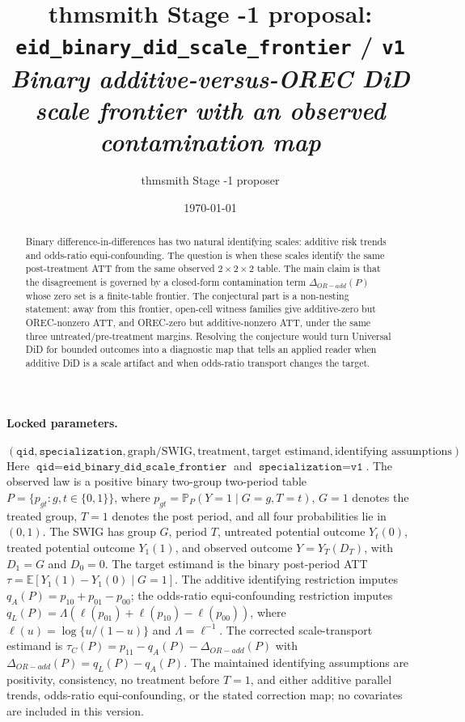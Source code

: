 \documentclass[11pt]{article}
\title{thmsmith Stage -1 proposal: \texttt{eid\_binary\_did\_scale\_frontier} / \texttt{v1}%
  \\ \large\textit{Binary additive-versus-OREC DiD scale frontier with an observed contamination map}}
\author{thmsmith Stage -1 proposer}
\date{\today}
\newcommand{\E}{\mathbb{E}}
\renewcommand{\Pr}{\mathbb{P}}
\theoremstyle{definition}
\theoremstyle{plain}
\theoremstyle{remark}
\begin{document}
\maketitle


\paragraph{Locked parameters.}
\[
(\texttt{qid},\texttt{specialization},\text{graph/SWIG},\text{treatment},\text{target estimand},\text{identifying assumptions}).
\]
Here \(\texttt{qid}=\texttt{eid\_binary\_did\_scale\_frontier}\) and \(\texttt{specialization}=\texttt{v1}\).  The observed law is a positive binary two-group two-period table \(P=\{p_{gt}:g,t\in\{0,1\}\}\), where \(p_{gt}=\Pr_P(Y=1\mid G=g,T=t)\), \(G=1\) denotes the treated group, \(T=1\) denotes the post period, and all four probabilities lie in \((0,1)\).  The SWIG has group \(G\), period \(T\), untreated potential outcome \(Y_t(0)\), treated potential outcome \(Y_1(1)\), and observed outcome \(Y=Y_T(D_T)\), with \(D_1=G\) and \(D_0=0\).  The target estimand is the binary post-period ATT \(\tau=\E[Y_1(1)-Y_1(0)\mid G=1]\).  The additive identifying restriction imputes \(q_A(P)=p_{10}+p_{01}-p_{00}\); the odds-ratio equi-confounding restriction imputes \(q_L(P)=\Lambda(\ell(p_{01})+\ell(p_{10})-\ell(p_{00}))\), where \(\ell(u)=\log\{u/(1-u)\}\) and \(\Lambda=\ell^{-1}\).  The corrected scale-transport estimand is \(\tau_C(P)=p_{11}-q_A(P)-\Delta_{OR-add}(P)\) with \(\Delta_{OR-add}(P)=q_L(P)-q_A(P)\).  The maintained identifying assumptions are positivity, consistency, no treatment before \(T=1\), and either additive parallel trends, odds-ratio equi-confounding, or the stated correction map; no covariates are included in this version.

\begin{abstract}
Binary difference-in-differences has two natural identifying scales: additive risk trends and odds-ratio equi-confounding.  The question is when these scales identify the same post-treatment ATT from the same observed \(2\times2\times2\) table.  The main claim is that the disagreement is governed by a closed-form contamination term \(\Delta_{OR-add}(P)\) whose zero set is a finite-table frontier.  The conjectural part is a non-nesting statement: away from this frontier, open-cell witness families give additive-zero but OREC-nonzero ATT, and OREC-zero but additive-nonzero ATT, under the same three untreated/pre-treatment margins.  Resolving the conjecture would turn Universal DiD for bounded outcomes into a diagnostic map that tells an applied reader when additive DiD is a scale artifact and when odds-ratio transport changes the target.
\end{abstract}
\end{document}
